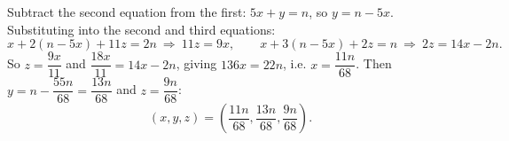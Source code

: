 Subtract the second equation from the first: $5x+y=n$, so $y=n-5x$. Substituting into the second and third equations:
\[x+2(n-5x)+11z=2n\ \Rightarrow\ 11z=9x,\qquad x+3(n-5x)+2z=n\ \Rightarrow\ 2z=14x-2n.\]
So $z=\dfrac{9x}{11}$ and $\dfrac{18x}{11}=14x-2n$, giving $136x=22n$, i.e. $x=\dfrac{11n}{68}$. Then $y=n-\dfrac{55n}{68}=\dfrac{13n}{68}$ and $z=\dfrac{9n}{68}$:
\[\boxed{(x,y,z)=\left(\dfrac{11n}{68},\dfrac{13n}{68},\dfrac{9n}{68}\right)}.\]
